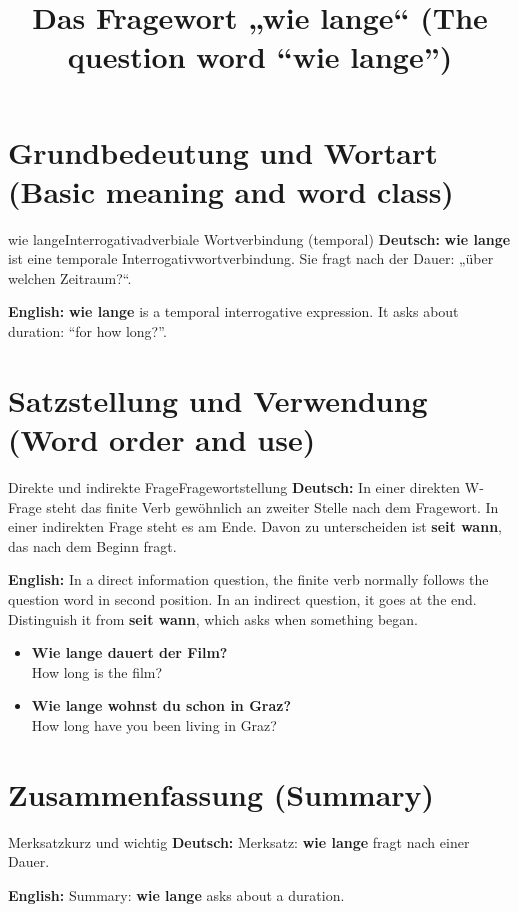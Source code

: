 \documentclass[a4paper,11pt]{article}
\title{Das Fragewort „wie lange“ (The question word “wie lange”)}
\date{}
\newcommand{\GermanText}[1]{\textbf{Deutsch: }#1\par}
\newcommand{\EnglishText}[1]{{\small\color{SoftGray}\textbf{English: }#1\par}}
\newcommand{\ExampleItem}[2]{\item \textbf{#1}\\{\small\color{SoftGray}#2}}
\begin{document}
\maketitle
\tableofcontents
\newpage
\section{Grundbedeutung und Wortart (Basic meaning and word class)}
\begin{grammarentry}{wie lange}{Interrogativadverbiale Wortverbindung (temporal)}
\GermanText{\textbf{wie lange} ist eine temporale Interrogativwortverbindung. Sie fragt nach der Dauer: „über welchen Zeitraum?“.}
\EnglishText{\textbf{wie lange} is a temporal interrogative expression. It asks about duration: “for how long?”.}

\end{grammarentry}
\section{Satzstellung und Verwendung (Word order and use)}
\begin{grammarentry}{Direkte und indirekte Frage}{Fragewortstellung}
\GermanText{In einer direkten W-Frage steht das finite Verb gewöhnlich an zweiter Stelle nach dem Fragewort. In einer indirekten Frage steht es am Ende. Davon zu unterscheiden ist \textbf{seit wann}, das nach dem Beginn fragt.}
\EnglishText{In a direct information question, the finite verb normally follows the question word in second position. In an indirect question, it goes at the end. Distinguish it from \textbf{seit wann}, which asks when something began.}
\end{grammarentry}
\begin{exbox}\begin{itemize}
\ExampleItem{Wie lange dauert der Film?}{How long is the film?}
\ExampleItem{Wie lange wohnst du schon in Graz?}{How long have you been living in Graz?}
\end{itemize}\end{exbox}
\section{Zusammenfassung (Summary)}
\begin{grammarentry}{Merksatz}{kurz und wichtig}
\GermanText{Merksatz: \textbf{wie lange} fragt nach einer Dauer.}
\EnglishText{Summary: \textbf{wie lange} asks about a duration.}
\end{grammarentry}
\end{document}
